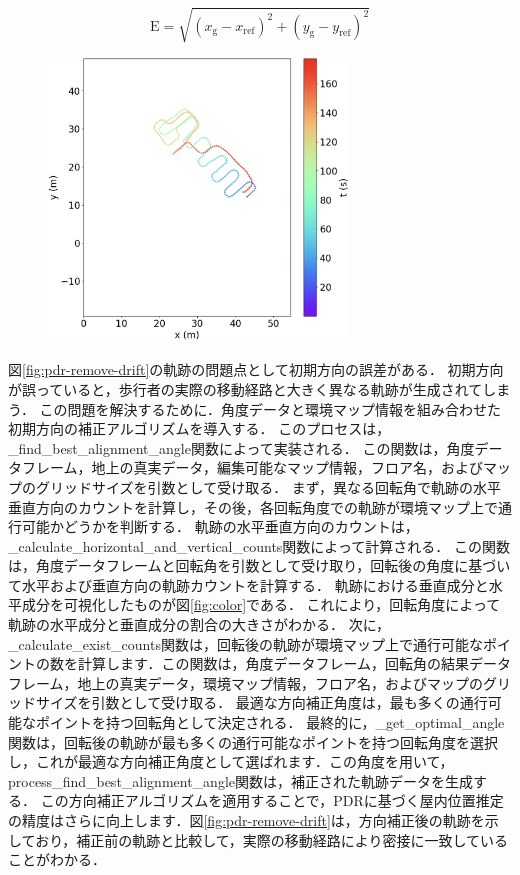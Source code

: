 \documentclass[Japanese]{dicomopapers}
\begin{document}
\vspace{5mm} %
\begin{equation}
	\mathrm{E} = \sqrt{(x_{\mathrm{g}} - x_{\mathrm{ref}})^2 + (y_{\mathrm{g}} - y_{\mathrm{ref}})^2}
\end{equation}
\vspace{5mm} %



\begin{figure}[h]
	\centering
	\includegraphics[width=80mm]{image/pdr-remove-drift-two.jpg}
\end{figure}


図\ref{fig:pdr-remove-drift}の軌跡の問題点として初期方向の誤差がある．
初期方向が誤っていると，歩行者の実際の移動経路と大きく異なる軌跡が生成されてしまう．
この問題を解決するために．角度データと環境マップ情報を組み合わせた初期方向の補正アルゴリズムを導入する．
このプロセスは，\_find\_best\_alignment\_angle関数によって実装される．
この関数は，角度データフレーム，地上の真実データ，編集可能なマップ情報，フロア名，およびマップのグリッドサイズを引数として受け取る．
まず，異なる回転角で軌跡の水平垂直方向のカウントを計算し，その後，各回転角度での軌跡が環境マップ上で通行可能かどうかを判断する．
軌跡の水平垂直方向のカウントは，\_calculate\_horizontal\_and\_vertical\_counts関数によって計算される．
この関数は，角度データフレームと回転角を引数として受け取り，回転後の角度に基づいて水平および垂直方向の軌跡カウントを計算する．
軌跡における垂直成分と水平成分を可視化したものが図\ref{fig:color}である．
これにより，回転角度によって軌跡の水平成分と垂直成分の割合の大きさがわかる．
次に，\_calculate\_exist\_counts関数は，回転後の軌跡が環境マップ上で通行可能なポイントの数を計算します．この関数は，角度データフレーム，回転角の結果データフレーム，地上の真実データ，環境マップ情報，フロア名，およびマップのグリッドサイズを引数として受け取る．
最適な方向補正角度は，最も多くの通行可能なポイントを持つ回転角として決定される．
最終的に，\_get\_optimal\_angle関数は，回転後の軌跡が最も多くの通行可能なポイントを持つ回転角度を選択し，これが最適な方向補正角度として選ばれます．この角度を用いて，process\_find\_best\_alignment\_angle関数は，補正された軌跡データを生成する．
この方向補正アルゴリズムを適用することで，PDRに基づく屋内位置推定の精度はさらに向上します．図\ref{fig:pdr-remove-drift}は，方向補正後の軌跡を示しており，補正前の軌跡と比較して，実際の移動経路により密接に一致していることがわかる．
\end{document}
